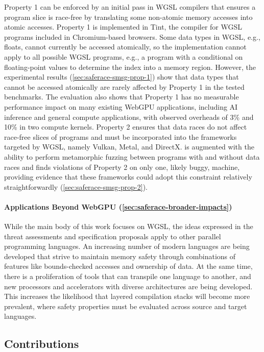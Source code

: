 Property 1 can be enforced by an initial pass in WGSL compilers that ensures a program slice is race-free by translating some non-atomic memory accesses into atomic accesses. Property 1 is implemented in Tint, the compiler for WGSL programs included in Chromium-based browsers. Some data types in WGSL, e.g., floats, cannot currently be accessed atomically, so the implementation cannot apply to all possible WGSL programs, e.g., a program with a conditional on floating-point values to determine the index into a memory region. However, the experimental results (\mysec\ref{sec:saferace-smsg-prop-1}) show that data types that cannot be accessed atomically are rarely affected by Property 1 in the tested benchmarks. The evaluation also shows that Property 1 has no measurable performance impact on many existing WebGPU applications, including AI inference and general compute applications, with observed overheads of 3\% and 10\% in two compute kernels. Property 2 ensures that data races do not affect race-free slices of programs and must be incorporated into the frameworks targeted by WGSL, namely Vulkan, Metal, and DirectX. \wgslmemsmith is augmented with the ability to perform metamorphic fuzzing between programs with and without data races and finds violations of Property 2 on only one, likely buggy, machine, providing evidence that these frameworks could adopt this constraint relatively straightforwardly (\mysec\ref{sec:saferace-smsg-prop-2}).

\paragraph{Applications Beyond WebGPU (\mysec\ref{sec:saferace-broader-impacts})}

While the main body of this work focuses on WGSL, the ideas expressed in the threat assessments and specification proposals apply to other parallel programming languages. An increasing number of modern languages are being developed that strive to maintain memory safety through combinations of features like bounds-checked accesses and ownership of data. At the same time, there is a proliferation of tools that can transpile one language to another, and new processors and accelerators with diverse architectures are being developed. This increases the likelihood that layered compilation stacks will become more prevalent, where safety properties must be evaluated across source and target languages.


\subsection{Contributions}

